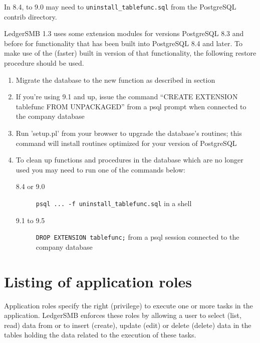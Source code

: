 In 8.4, to 9.0 may need to  \texttt{uninstall\_tablefunc.sql} from the PostgreSQL contrib directory.

LedgerSMB 1.3 uses some extension modules for versions PostgreSQL 8.3 and before for functionality
that has been built into PostgreSQL 8.4 and later. To make use of the (faster) built in version
of that functionality, the following restore procedure should be used.

\begin{enumerate}
\item Migrate the database to the new function as described in section
\item If you're using 9.1 and up, issue the command ``CREATE EXTENSION tablefunc FROM UNPACKAGED''
   from a psql prompt when connected to the company database
\item Run 'setup.pl' from your browser to upgrade the database's routines; this command will
   install routines optimized for your version of PostgreSQL
\item To clean up functions and procedures in the database which are no longer used you may need to run one of the commands below:
        \begin{description}
        \item [8.4 or 9.0]   \texttt{psql ... -f uninstall\_tablefunc.sql} in a shell
        \item [9.1  to 9.5] \texttt{DROP EXTENSION tablefunc;} from a psql session connected to the company database
        \end{description}
\end{enumerate}


\chapter{Listing of application roles}
\label{app-role-listing}

Application roles  specify the right (privilege) to execute one or more tasks in the application.
LedgerSMB enforces these roles by allowing a user to select (list, read) data from or to
insert (create), update (edit) or delete (delete) data in the tables holding the data
related to the execution of these tasks.


